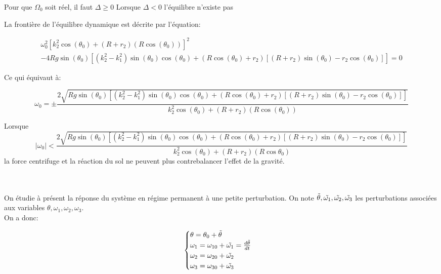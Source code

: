 Pour que $\Omega_0$ soit réel, il faut $\Delta \geq 0$
Lorsque $\Delta < 0$ l'équilibre n'existe pas

La frontière de l'équilibre dynamique est décrite par l'équation:

\begin{equation}
 \begin{split}
 \omega_0^2[k_2^2 \cos(\theta_0)+(R+r_2)(R \cos(\theta_0))]^2 \\
 -4 R g \sin(\theta_0)[(k_2^2-k_1^2)\sin(\theta_0)\cos(\theta_0)+(R \cos(\theta_0)+r_2)[(R+r_2)\sin(\theta_0)-r_2 \cos(\theta_0)]] = 0
 \end{split}
  \label{eq:b15}
\end{equation}

Ce qui équivaut à:

\begin{equation}
 \omega_0= \pm \frac{2\sqrt{R g \sin(\theta_0)[(k_2^2-k_1^2)\sin(\theta_0)\cos(\theta_0)+(R \cos(\theta_0)+r_2)[(R+r_2)\sin(\theta_0)-r_2 \cos(\theta_0)]]}}{k_2^2 \cos(\theta_0)+(R+r_2)(R \cos(\theta_0))}
  \label{eq:b16}
\end{equation}

Lorsque $$ |\omega_0| < \frac{2\sqrt{R g \sin(\theta_0)[(k_2^2-k_1^2)\sin(\theta_0)\cos(\theta_0)+(R \cos(\theta_0)+r_2)[(R+r_2)\sin(\theta_0)-r_2 \cos(\theta_0)]]}}{k_2^2 \cos(\theta_0)+(R+r_2)(R \cos{\theta_0})}
$$
 la force centrifuge et la réaction du sol ne peuvent plus contrebalancer l'effet de la gravité.
 
 \\
 \\
On étudie à présent la réponse du système en régime permanent à une petite perturbation. On note $\Tilde{\theta}, \Tilde{\omega_1}, \Tilde{\omega_2}, \Tilde{\omega_3}$ les perturbations associées aux variables $\theta, \omega_1, \omega_2, \omega_3$. \\

On a donc:

\begin{equation}
 \begin{cases}
 \theta=\theta_0 + \Tilde{\theta} \\
 \omega_1= \omega_{10} + \Tilde{\omega_1} = \frac{d\Tilde{\theta} }{dt} \\
 \omega_2= \omega_{20} + \Tilde{\omega_2} \\
 \omega_3= \omega_{30} + \Tilde{\omega_3}
 \end{cases}
  \label{eq:b17}
\end{equation}


